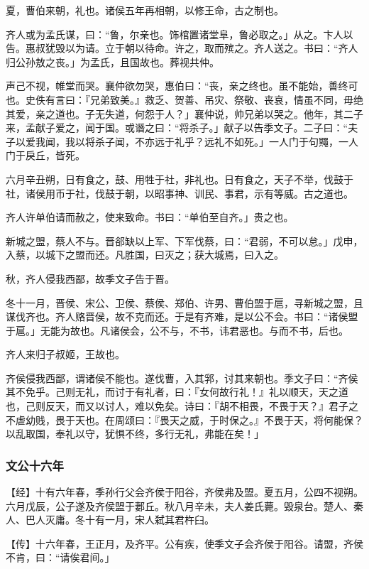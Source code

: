 \documentclass[]{article}
\begin{document}
夏，曹伯来朝，礼也。诸侯五年再相朝，以修王命，古之制也。

齐人或为孟氏谋，曰：``鲁，尔亲也。饰棺置诸堂阜，鲁必取之。」从之。卞人以告。惠叔犹毁以为请。立于朝以待命。许之，取而殡之。齐人送之。书曰：``齐人归公孙敖之丧。」为孟氏，且国故也。葬视共仲。

声己不视，帷堂而哭。襄仲欲勿哭，惠伯曰：``丧，亲之终也。虽不能始，善终可也。史佚有言曰：『兄弟致美。』救乏、贺善、吊灾、祭敬、丧哀，情虽不同，毋绝其爱，亲之道也。子无失道，何怨于人？」襄仲说，帅兄弟以哭之。他年，其二子来，孟献子爱之，闻于国。或谮之曰：``将杀子。」献子以告季文子。二子曰：``夫子以爱我闻，我以将杀子闻，不亦远于礼乎？远礼不如死。」一人门于句鼆，一人门于戾丘，皆死。

六月辛丑朔，日有食之，鼓、用牲于社，非礼也。日有食之，天子不举，伐鼓于社，诸侯用币于社，伐鼓于朝，以昭事神、训民、事君，示有等威。古之道也。

齐人许单伯请而赦之，使来致命。书曰：``单伯至自齐。」贵之也。

新城之盟，蔡人不与。晋郤缺以上军、下军伐蔡，曰：``君弱，不可以怠。」戊申，入蔡，以城下之盟而还。凡胜国，曰灭之；获大城焉，曰入之。

秋，齐人侵我西鄙，故季文子告于晋。

冬十一月，晋侯、宋公、卫侯、蔡侯、郑伯、许男、曹伯盟于扈，寻新城之盟，且谋伐齐也。齐人赂晋侯，故不克而还。于是有齐难，是以公不会。书曰：``诸侯盟于扈。」无能为故也。凡诸侯会，公不与，不书，讳君恶也。与而不书，后也。

齐人来归子叔姬，王故也。

齐侯侵我西鄙，谓诸侯不能也。遂伐曹，入其郛，讨其来朝也。季文子曰：``齐侯其不免乎。己则无礼，而讨于有礼者，曰：『女何故行礼！』礼以顺天，天之道也，己则反天，而又以讨人，难以免矣。诗曰：『胡不相畏，不畏于天？』君子之不虐幼贱，畏于天也。在周颂曰：『畏天之威，于时保之。』不畏于天，将何能保？以乱取国，奉礼以守，犹惧不终，多行无礼，弗能在矣！」

\hypertarget{header-n1246}{%
\subsubsection{文公十六年}\label{header-n1246}}

【经】十有六年春，季孙行父会齐侯于阳谷，齐侯弗及盟。夏五月，公四不视朔。六月戊辰，公子遂及齐侯盟于郪丘。秋八月辛未，夫人姜氏薨。毁泉台。楚人、秦人、巴人灭庸。冬十有一月，宋人弑其君杵臼。

【传】十六年春，王正月，及齐平。公有疾，使季文子会齐侯于阳谷。请盟，齐侯不肯，曰：``请俟君间。」
\end{document}
